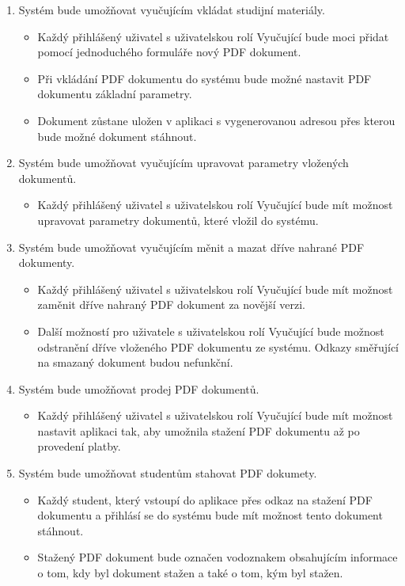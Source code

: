\begin{enumerate}
    \item Systém bude umožňovat vyučujícím vkládat studijní materiály.
        \begin{itemize}
            \item Každý přihlášený uživatel s uživatelskou rolí Vyučující bude moci přidat pomocí jednoduchého formuláře nový PDF dokument. 
            \item Při vkládání PDF dokumentu do systému bude možné nastavit PDF dokumentu základní parametry.
            \item Dokument zůstane uložen v aplikaci s vygenerovanou adresou přes kterou bude možné dokument stáhnout. 
        \end{itemize}

    \item Systém bude umožňovat vyučujícím upravovat parametry vložených dokumentů.
        \begin{itemize}
            \item Každý přihlášený uživatel s uživatelskou rolí Vyučující bude mít možnost upravovat parametry dokumentů, které vložil do systému.
        \end{itemize}

    \item Systém bude umožňovat vyučujícím měnit a mazat dříve nahrané PDF dokumenty.
        \begin{itemize}
            \item Každý přihlášený uživatel s uživatelskou rolí Vyučující bude mít možnost zaměnit dříve nahraný PDF dokument za novější verzi.
            \item Další možností pro uživatele s uživatelskou rolí Vyučující bude možnost odstranění dříve vloženého PDF dokumentu ze systému. Odkazy směřující na smazaný dokument budou nefunkční.
        \end{itemize}

    \item Systém bude umožňovat prodej PDF dokumentů.
        \begin{itemize} 
            \item Každý přihlášený uživatel s uživatelskou rolí Vyučující bude mít možnost nastavit aplikaci tak, aby umožnila stažení PDF dokumentu až po provedení platby.
        \end{itemize}

    \item Systém bude umožňovat studentům stahovat PDF dokumety.
        \begin{itemize}
            \item Každý student, který vstoupí do aplikace přes odkaz na stažení PDF dokumentu a přihlásí se do systému bude mít možnost tento dokument stáhnout.
            \item Stažený PDF dokument bude označen vodoznakem obsahujícím informace o tom, kdy byl dokument stažen a také o tom, kým byl stažen.
        \end{itemize}


\end{enumerate}
